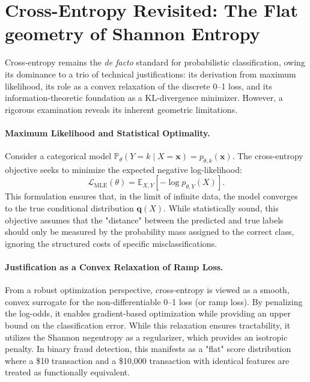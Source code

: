 \documentclass[sigconf,anonymous]{acmart}
\newcommand{\vx}{\mathbf{x}}
\newcommand{\vq}{\mathbf{q}}
\newcommand{\E}{\mathbb{E}}
\begin{document}
\section{Cross-Entropy Revisited: The Flat geometry of Shannon Entropy}
Cross-entropy remains the \emph{de facto} standard for probabilistic classification, owing its dominance to a trio of technical justifications: its derivation from maximum likelihood, its role as a convex relaxation of the discrete 0--1 loss, and its information-theoretic foundation as a KL-divergence minimizer. However, a rigorous examination reveals its inherent geometric limitations.

\paragraph{Maximum Likelihood and Statistical Optimality.}
Consider a categorical model $\mathbb{P}_\theta(Y = k \mid X = \vx) = p_{\theta,k}(\vx)$. The cross-entropy objective seeks to minimize the expected negative log-likelihood:
\begin{equation}
    \mathcal{L}_{\text{MLE}}(\theta) = \E_{X,Y}[-\log p_{\theta,Y}(X)].
\end{equation}
This formulation ensures that, in the limit of infinite data, the model converges to the true conditional distribution $\vq(X)$. While statistically sound, this objective assumes that the "distance" between the predicted and true labels should only be measured by the probability mass assigned to the correct class, ignoring the structured costs of specific misclassifications.

\paragraph{Justification as a Convex Relaxation of Ramp Loss.}
From a robust optimization perspective, cross-entropy is viewed as a smooth, convex surrogate for the non-differentiable 0--1 loss (or ramp loss). By penalizing the log-odds, it enables gradient-based optimization while providing an upper bound on the classification error. While this relaxation ensures tractability, it utilizes the Shannon negentropy as a regularizer, which provides an isotropic penalty. In binary fraud detection, this manifests as a "flat" score distribution where a \$10 transaction and a \$10,000 transaction with identical features are treated as functionally equivalent.
\end{document}
